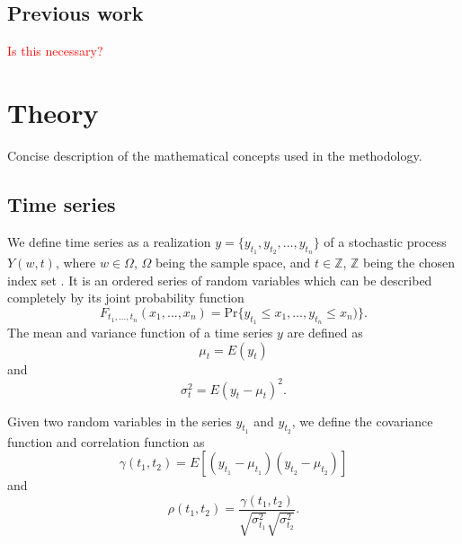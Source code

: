 \documentclass{article}
\theoremstyle{plain}
\theoremstyle{definition}
\theoremstyle{remark}
\begin{document}
\subsection{Previous work}
\textcolor{red}{Is this necessary?}


\section{Theory}
Concise description of the mathematical concepts used in the methodology.
\subsection{Time series}
We define time series as a realization $y = \{ y_{t_1}, y_{t_2}, \hdots, y_{t_n} \}$ of a stochastic process $Y(w, t)$, where $w \in \Omega$, $\Omega$ being the sample space,  and $t \in \mathbb{Z}$, $\mathbb{Z}$ being the chosen index set  \cite{wei}.
It is an ordered series of random variables which can be described completely by its joint probability function
\begin{equation*}
        F_{t_1,\hdots, t_n}(x_1, \hdots, x_n) = \text{Pr}\{ y_{t_1} \leq x_{1}, \hdots, y_{t_n} \leq x_n) \}.
\end{equation*}
The mean and variance function of a time series $y$ are defined as
\begin{equation}\label{eq:mean_func}
        \mu_t = E(y_t)  
\end{equation}
and
\begin{equation*}
        \sigma_t^2 = E(y_t - \mu_t)^2.
\end{equation*}

Given two random variables in the series $y_{t_1}$ and $y_{t_2}$, we define the covariance function and correlation function as
\begin{equation}\label{eq:acv}
        \gamma (t_{1}, t_2) = E[(y_{t_1} - \mu_{t_1})(y_{t_2} - \mu_{t_2})]
\end{equation}
and 
\begin{equation}\label{eq:acf}
        \rho(t_1, t_2) = \frac{\gamma ( t_1, t_2)}{\sqrt{\sigma_{t_1}^2}\sqrt{\sigma_{t_2}^{2}}}.
\end{equation}
\end{document}

